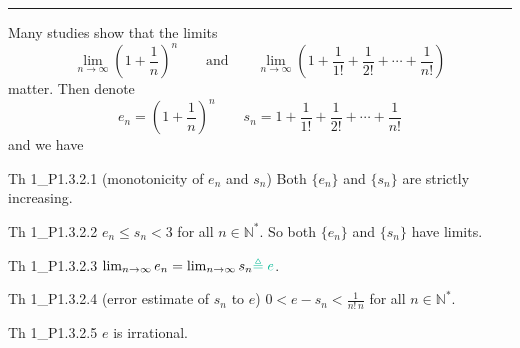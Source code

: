 \documentclass{article}
\begin{document}
\noindent\rule{\textwidth}{2pt}

Many studies show that the limits
$$ \lim_{n\to\infty}\left(1+\frac{1}{n}\right)^n \qquad\text{and}\qquad \lim_{n\to\infty}\left(1+\frac{1}{1!}+\frac{1}{2!}+\cdots+\frac{1}{n!}\right) $$
matter. Then denote
$$ e_n = \left(1+\frac{1}{n}\right)^n\qquad s_n = 1+\frac{1}{1!}+\frac{1}{2!}+\cdots+\frac{1}{n!} $$ 
and we have

\begin{Th}{Th 1\_P1.3.2.1 (monotonicity of $e_n$ and $s_n$)}
    Both $\{e_n\}$ and $\{s_n\}$ are strictly increasing.
\end{Th}

\begin{Th}{Th 1\_P1.3.2.2}
    $e_n \leq s_n < 3$ for all $n\in\mathbb{N}^\ast$. So both $\{e_n\}$ and $\{s_n\}$ have limits.
\end{Th}

\begin{Th}{Th 1\_P1.3.2.3}
    $\lim_{n\to\infty}e_n = \lim_{n\to\infty}s_n \textcolor{Df}{\triangleq e}$.
\end{Th}

\begin{Th}{Th 1\_P1.3.2.4 (error estimate of $s_n$ to $e$)}
    $0<e-s_n<\frac{1}{n!\,n}$ for all $n\in\mathbb{N}^\ast$.
\end{Th} 

\begin{Th}{Th 1\_P1.3.2.5}
    $e$ is irrational.
\end{Th}
\end{document}
